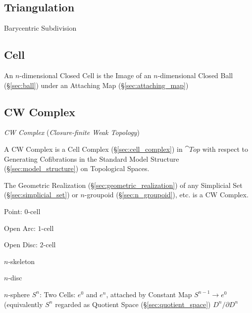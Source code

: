 \subsection{Triangulation}\label{sec:triangulation}

Barycentric Subdivision



\subsection{Cell}\label{sec:topology_cell}

An $n$-dimensional Closed Cell is the Image of an $n$-dimensional
Closed Ball (\S\ref{sec:ball}) under an Attaching Map
(\S\ref{sec:attaching_map})



\subsection{CW Complex}\label{sec:cw_complex}

\emph{CW Complex} (\emph{Closure-finite Weak Topology})

A CW Complex is a Cell Complex (\S\ref{sec:cell_complex}) in $\cat{Top}$ with
respect to Generating Cofibrations in the Standard Model Structure
(\S\ref{sec:model_structure}) on Topological Spaces.

The Geometric Realization (\S\ref{sec:geometric_realization}) of any Simplicial
Set (\S\ref{sec:simplicial_set}) or $n$-groupoid (\S\ref{sec:n_groupoid}), etc.
is a CW Complex.

Point: $0$-cell

Open Arc: $1$-cell

Open Disc: $2$-cell

$n$-skeleton

$n$-disc

$n$-sphere $S^n$: Two Cells: $e^0$ and $e^n$, attached by Constant Map
$S^{n-1} \rightarrow e^0$ (equivalently $S^n$ regarded as Quotient
Space (\S\ref{sec:quotient_space}) $D^n/ \partial D^n$

